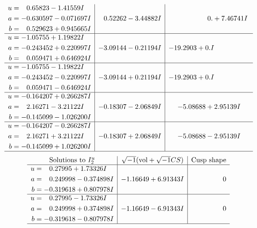 \documentclass[1p]{elsarticle_modified}
\theoremstyle{definition}
\newcommand{\I}{\sqrt{-1}}
\begin{document}
$$\begin{array}{c|c|c}
\begin{aligned}
u &= \phantom{-}0.65823 - 1.41559 I \\
a &= -0.630597 - 0.071697 I \\
b &= \phantom{-}0.529623 + 0.945665 I\end{aligned}
 & \phantom{-}0.52262 - 3.44882 I & \phantom{-0.000000 -}0. + 7.46741 I \\ \hline\begin{aligned}
u &= -1.05755 + 1.19822 I \\
a &= -0.243452 + 0.220997 I \\
b &= \phantom{-}0.059471 + 0.646924 I\end{aligned}
 & -3.09144 - 0.21194 I & -19.2903 + 0. I\phantom{ +0.000000I} \\ \hline\begin{aligned}
u &= -1.05755 - 1.19822 I \\
a &= -0.243452 - 0.220997 I \\
b &= \phantom{-}0.059471 - 0.646924 I\end{aligned}
 & -3.09144 + 0.21194 I & -19.2903 + 0. I\phantom{ +0.000000I} \\ \hline\begin{aligned}
u &= -0.164207 + 0.266287 I \\
a &= \phantom{-}2.16271 - 3.21122 I \\
b &= -0.145099 - 1.026200 I\end{aligned}
 & -0.18307 - 2.06849 I & -5.08688 + 2.95139 I \\ \hline\begin{aligned}
u &= -0.164207 - 0.266287 I \\
a &= \phantom{-}2.16271 + 3.21122 I \\
b &= -0.145099 + 1.026200 I\end{aligned}
 & -0.18307 + 2.06849 I & -5.08688 - 2.95139 I\\
 \hline 
 \end{array}$$\newpage$$\begin{array}{c|c|c}  
\text{Solutions to }I^u_{2}& \I (\text{vol} + \sqrt{-1}CS) & \text{Cusp shape}\\
 \hline 
\begin{aligned}
u &= \phantom{-}0.27995 + 1.73326 I \\
a &= \phantom{-}0.249998 - 0.374898 I \\
b &= -0.319618 + 0.807978 I\end{aligned}
 & -1.16649 + 6.91343 I & \phantom{-0.000000 } 0 \\ \hline\begin{aligned}
u &= \phantom{-}0.27995 - 1.73326 I \\
a &= \phantom{-}0.249998 + 0.374898 I \\
b &= -0.319618 - 0.807978 I\end{aligned}
 & -1.16649 - 6.91343 I & \phantom{-0.000000 } 0\\
 \hline 
 \end{array}$$\newpage
\end{document}
